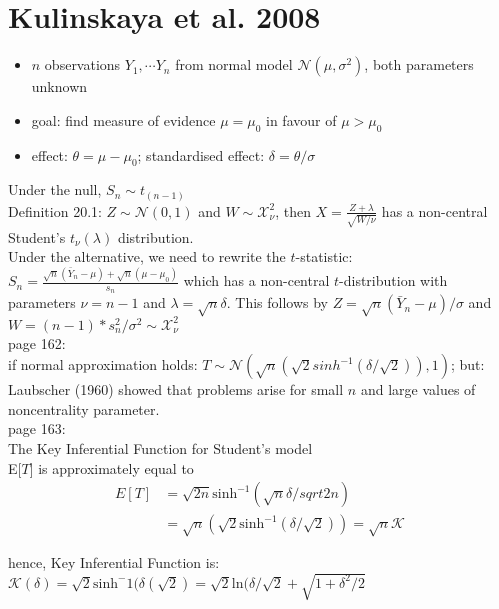 \section{Kulinskaya et al. 2008}

\begin{itemize}
    \item $n$ observations $Y_1,\cdots Y_n$ from normal model $\mathcal{N}(\mu,\sigma^2)$, both parameters unknown
    \item goal: find measure of evidence $\mu = \mu_0$ in favour of $\mu > \mu_0$
    \item effect: $\theta = \mu-\mu_0$; standardised effect: $\delta = \theta/\sigma$
\end{itemize}

Under the null, $S_n \sim t_(n-1)$\\

Definition 20.1: $Z\sim \mathcal{N}(0,1)$ and $W\sim \mathcal{X}_\nu^2$, then $X = \frac{Z+\lambda}{\sqrt{W/\nu}}$ has a non-central Student's $t_\nu(\lambda)$ distribution.\\

Under the alternative, we need to rewrite the $t$-statistic: $S_n = \frac{\sqrt{n}(\bar{Y}_n-\mu)+\sqrt{n}(\mu-\mu_0)}{s_n}$ which has a non-central $t$-distribution with parameters $\nu = n-1$ and $\lambda = \sqrt{n}\delta$. This follows by $Z = \sqrt{n}(\bar{Y}_n-\mu)/\sigma$ and $W=(n-1)*s_n^2/\sigma^2\sim \mathcal{X}_{\nu}^2$\\

page 162:\\
if normal approximation holds: $T\sim \mathcal{N}(\sqrt{n}(\sqrt{2}sinh^{-1}(\delta/\sqrt{2})),1)$; but: Laubscher (1960) showed that problems arise for small $n$ and large values of noncentrality parameter.\\

page 163:\\
The Key Inferential Function for Student's model\\
E[$T$] is approximately equal to 
\begin{align*}
    E[T] &= \sqrt{2n}\text{sinh}^{-1}(\sqrt{n}\delta/sqrt{2n})\\
    &= \sqrt{n}(\sqrt{2}\text{sinh}^{-1}(\delta/\sqrt{2})) = \sqrt{n}\mathcal{K}
\end{align*}

hence, Key Inferential Function is: $\mathcal{K}(\delta)=\sqrt{2}\text{sinh}^-1(\delta(\sqrt{2})=\sqrt{2}\text{ln}(\delta/\sqrt{2}+\sqrt{1+\delta^2/2}$\\

